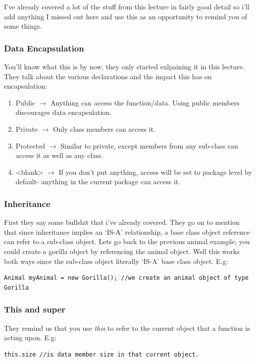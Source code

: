 \documentclass{article}
\begin{document}
I've already covered a lot of the stuff from this lecture in fairly good detail so i'll add anything I 
missed out here and use this as an opportunity to remind you of some things.

\subsubsection{Data Encapsulation}
You'll know what this is by now, they only started exlpaining it in this lecture. They talk about
the various  declarations and the impact this has on encapsulation:

\begin{enumerate}
\item  Public $\longrightarrow$ Anything can access the function/data. Using public members discourages
	data encapsulation.
\item  Private $\longrightarrow$ Only class members can access it.
\item  Protected $\longrightarrow$ Similar to private, except members from any sub-class can access it
	as well as any class.
\item  <blank> $\longrightarrow$ If you don't put anything, access will be set to package level by
	default- anything in the current package can access it.
\end{enumerate}	

\subsubsection{Inheritance}
First they say some bullshit that i've already covered. They go on to mention that since inheritance
implies an `IS-A' relationship, a base class object reference can refer to a sub-class object. Lets go
back to the previous animal example; you could create a gorilla object by referencing the animal object.
Well this works both ways since the sub-class object literally `IS-A' base class object. E.g:
\newline
\begin{lstlisting}
Animal myAnimal = new Gorilla(); //we create an animal object of type Gorilla
\end{lstlisting}

\subsubsection{This and super}
They remind us that you use \emph{this} to refer to the current object that a function is acting upon.
E.g: 
\begin{lstlisting}
this.size //is data member size in that current object.
\end{lstlisting}
\end{document}
